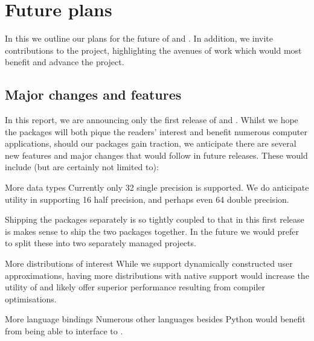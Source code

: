 \section{Future plans}
\label{sec:future_plans}

In this  we outline our plans for the future of \arv and \pyarv. In addition, we invite contributions to the project, highlighting the avenues of work which would most benefit and advance the project. 

\subsection{Major changes and features}

In this report, we are announcing only the first release of \arv and \pyarv. Whilst we hope the packages will both pique the readers' interest and benefit numerous computer applications, should our packages gain traction, we anticipate there are several new features and major changes that would follow in future releases. These would include (but are certainly not limited to):
\begin{longdescription}
\item[More data types] Currently only \qty{32}{\bit} single precision is supported. We do anticipate utility in supporting \qty{16}{\bit} half precision, and perhaps even \qty{64}{\bit} double precision.
\item[Shipping the packages separately] \pyarv is so tightly coupled to \arv that in this first release is makes sense to ship the two packages together. In the future we would prefer to split these into two separately managed projects. 
\item[More distributions of interest] While we support dynamically constructed user approximations, having more distributions with native support would increase the utility of \arv and likely offer superior performance resulting from compiler optimisations. 
\item[More language bindings] Numerous other languages besides Python would benefit from being able to interface to \arv.
\end{longdescription}

